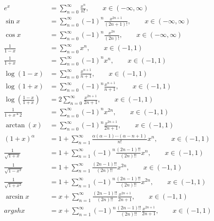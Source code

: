 \begin{align}
	e^x &= \sum_{n=0}^\infty \frac{x^n}{n!}, \qquad x \in (-\infty,\infty) \\
	\sin x &= \sum_{n=0}^\infty (-1)^n \frac{x^{2n+1}}{(2n+1)!}, \qquad x \in (-\infty,\infty) \\ 
	\cos x &= \sum_{n=0}^\infty (-1)^n \frac{x^{2n}}{(2n)!}, \qquad x \in (-\infty,\infty) \\
	\frac{1}{1-x} &= \sum_{n=0}^\infty x^n, \qquad x \in (-1,1) \\
	\frac{1}{1+x} &= \sum_{n=0}^\infty (-1)^n x^n, \qquad x \in (-1,1) \\
	\log(1-x) &= \sum_{n=0}^\infty \frac{x^{n+1}}{n+1}, \qquad x \in (-1,1) \\
	\log(1+x) &= \sum_{n=0}^\infty (-1)^n \frac{x^{n+1}}{n+1}, \qquad x \in (-1,1) \\
	\log(\frac{1-x}{1+x}) &= 2\sum_{n=0}^\infty \frac{x^{2n+1}}{2n+1}, \qquad x \in (-1,1) \\
	\frac{1}{1+x*2} &= \sum_{n=0}^\infty (-1)^n x^{2n}, \qquad x \in (-1,1) \\
	\arctan(x) &= \sum_{n=0}^\infty (-1)^n \frac{x^{2n+1}}{2n+1}, \qquad x \in (-1,1) \\
	(1+x)^\alpha &= 1 + \sum_{n=1}^\infty \frac{\alpha(\alpha-1)\cdots(\alpha-n+1)}{n!}x^n, \qquad x \in (-1,1) \\
	\frac{1}{\sqrt{1+x}} &= 1 + \sum_{n=1}^\infty (-1)^n \frac{(2n-1)!!}{(2n)!!}x^n, \qquad x \in (-1,1) \\
	\frac{1}{\sqrt{1-x^2}} &= 1 +  \sum_{n=1}^\infty \frac{(2n-1)!!}{(2n)!!}x^{2n}, \qquad x \in (-1,1) \\
	\frac{1}{\sqrt{1+x^2}} &= 1 + \sum_{n=1}^\infty (-1)^n \frac{(2n-1)!!}{(2n)!!}x^{2n}, \qquad x \in (-1,1) \\
	\arcsin x &= x+ \sum_{n=1}^\infty  \frac{(2n-1)!!}{(2n)!!}\frac{x^{2n+1}}{2n+1}, \qquad x \in (-1,1) \\
	argsh x &= x+ \sum_{n=1}^\infty  (-1)^n \frac{(2n-1)!!}{(2n)!!}\frac{x^{2n+1}}{2n+1}, \qquad x \in (-1,1) 
\end{align}


